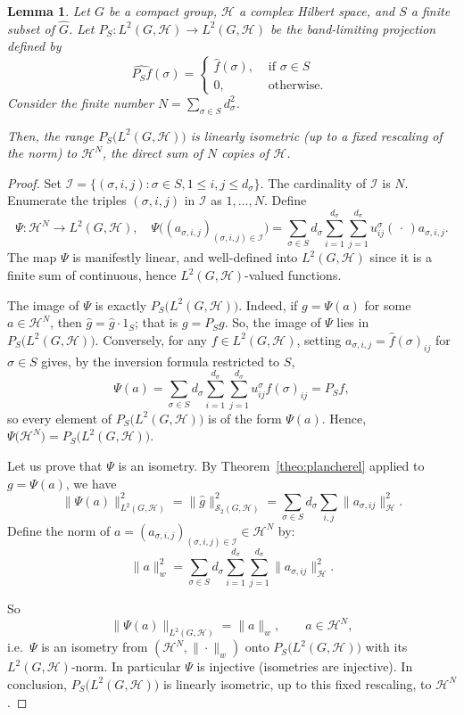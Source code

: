 \documentclass[11pt]{amsart}
\newtheorem{lemma}[theorem]{Lemma}
\begin{document}
\begin{lemma}\label{lem:PS-finite-dim}
Let $G$ be a compact group, $\mathcal{H}$ a complex Hilbert space, and $S$  a finite subset of $\widehat{G}$.
Let $P_S:L^2(G,\mathcal{H})\to L^2(G,\mathcal{H})$ be the band-limiting projection defined by
$$\widehat{P_Sf}(\sigma)=\left\lbrace\begin{array}{cc}
\widehat f(\sigma), & \text{ if } \sigma\in S\\ 
0, & \text{ otherwise. }
\end{array}\right.$$ 
 Consider the finite number $
N=\sum\limits_{\sigma\in S}d_\sigma^2$.

Then, the range $P_S\big(L^2(G,\mathcal{H})\big)$ is
linearly isometric (up to a fixed rescaling of the norm) to $\mathcal{H}^N$,  the
direct sum of $N$ copies of $\mathcal{H}$.
\end{lemma}

\begin{proof}
 Set $\mathcal{I}=\{(\sigma,i,j): \sigma\in S, 1\le i,j\le d_\sigma\}$. The cardinality of $\mathcal{I}$ is $N$. Enumerate the  triples
$(\sigma,i,j)$ in  $\mathcal{I}$  as $1,\dots,N$. Define
$$
\Psi:\mathcal{H}^N\longrightarrow L^2(G,\mathcal{H}),\quad
\Psi\big((a_{\sigma,i,j})_{(\sigma,i,j)\in \mathcal{I}} \big)=\sum_{\sigma\in S}d_\sigma
\sum_{i=1}^{d_\sigma}\sum_{j=1}^{d_\sigma}u^\sigma_{ij}(\,\cdot\,)a_{\sigma,i,j}.
$$
The map $\Psi$ is manifestly linear, and well-defined into $L^2(G,\mathcal{H})$ since it is a finite sum
of continuous, hence $L^2(G,\mathcal{H})$-valued functions.

\noindent The image of $\Psi$ is exactly $P_S\big(L^2(G,\mathcal{H})\big)$. Indeed, if $g=\Psi(a)$
for some $a\in\mathcal{H}^N$, then
 $\widehat{g}=\widehat{g}\cdot 1_S$; that is  $g=P_Sg$. So,  the image of $\Psi$ lies in
$P_S\big(L^2(G,\mathcal{H})\big)$. Conversely, for any $f\in L^2(G,\mathcal{H})$, setting
$a_{\sigma,i,j}=\hat f(\sigma)_{ij}$ for $\sigma\in S$ gives, by the inversion formula
restricted to $S$,
$$
\Psi(a)=\sum_{\sigma\in S}d_\sigma\sum_{i=1}^{d_\sigma}\sum_{j=1}^{d_\sigma}u^\sigma_{ij}\widehat f(\sigma)_{ij}=P_Sf,
$$
so every element of $P_S\big(L^2(G,\mathcal{H})\big)$ is of the form $\Psi(a)$. Hence,
$\Psi\big(\mathcal{H}^N\big)=P_S\big(L^2(G,\mathcal{H})\big)$.

Let us prove that  $\Psi$ is an  isometry.  By  Theorem~\ref{theo:plancherel} applied to $g=\Psi(a)$, we have 
$$
\|\Psi(a)\|_{L^2(G,\mathcal{H})}^2=\|\widehat{g}\|_{\mathscr{S}_2(G,\mathcal{H})}^2=\sum_{\sigma\in S}
d_\sigma\sum_{i,j}\|a_{\sigma,ij}\|_\mathcal{H}^2.
$$
Define the norm of  $a=(a_{\sigma,i,j})_{(\sigma,i,j)\in \mathcal{I}}\in \mathcal{H}^N$  by:
$$\|a\|_{w}^2=\sum_{\sigma\in S}d_\sigma\sum_{i=1}^{d_\sigma}\sum_{j=1}^{d_\sigma}\|a_{\sigma,ij}\|_\mathcal{H}^2.$$ 

So
\[
\|\Psi(a)\|_{L^2(G,\mathcal{H})}=\|a\|_w,\qquad a\in\mathcal{H}^N,
\]
i.e.\ $\Psi$ is an isometry from $(\mathcal{H}^N,\|\cdot\|_w)$ onto $P_S\big(L^2(G,\mathcal{H})\big)$
with its $L^2(G,\mathcal{H})$-norm. In particular $\Psi$ is injective (isometries are
injective). In conclusion, 
 $P_S\big(L^2(G,\mathcal{H})\big)$ is linearly isometric, up to this fixed rescaling, to
$\mathcal{H}^N$.
\end{proof}
\end{document}
